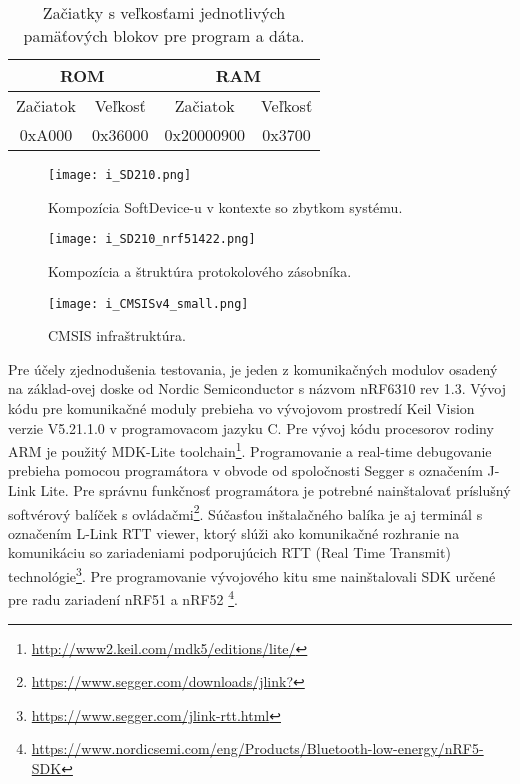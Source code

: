 \documentclass[12pt,a4paper,oneside,openright]{report}
\begin{document}
\begin{table}[h]
	\centering
	\caption{Začiatky s veľkosťami jednotlivých pamäťových blokov pre program a dáta.}
	\label{t:s210_memory}
	\begin{tabular}{|c|c|c|c|}
		\hline
		\multicolumn{2}{|c|}{ROM} & \multicolumn{2}{c|}{RAM} \\ \hline
		Začiatok     & Veľkosť    & Začiatok     & Veľkosť   \\ \hline
		0xA000       & 0x36000    & 0x20000900   & 0x3700    \\ \hline
	\end{tabular}
\end{table}

\begin{figure*}[h]
	\centering
	\texttt{[image: i\_SD210.png]}
	\caption{Kompozícia SoftDevice-u v kontexte so zbytkom systému\cite{SD210}.}
	\label{f:o_SD210}
\end{figure*}

\begin{figure*}[h]
	\centering
	\texttt{[image: i\_SD210\_nrf51422.png]}
	\caption{Kompozícia a štruktúra protokolového zásobníka\cite{SD210}.}
	\label{f:o_SD210_alone}
\end{figure*}

\begin{figure*}[h]
	\centering
	\texttt{[image: i\_CMSISv4\_small.png]}
	\caption{CMSIS infraštruktúra\cite{CMSIS}.}
	\label{f:o_CMSIS}
\end{figure*}

Pre účely zjednodušenia testovania, je jeden z komunikačných modulov osadený na základ-ovej doske od Nordic Semiconductor s názvom nRF6310 rev 1.3.
Vývoj kódu pre komunikačné moduly prebieha vo vývojovom prostredí Keil {\textmu}Vision verzie V5.21.1.0 v programovacom jazyku C. Pre vývoj kódu procesorov rodiny ARM je použitý MDK-Lite toolchain\footnote{\url{http://www2.keil.com/mdk5/editions/lite/}}. 
Programovanie a real-time debugovanie prebieha pomocou programátora v obvode od spoločnosti Segger s označením J-Link Lite. Pre správnu funkčnosť programátora je potrebné nainštalovať príslušný softvérový balíček s ovládačmi\footnote{\url{https://www.segger.com/downloads/jlink?}}. Súčasťou inštalačného balíka je aj terminál s označením L-Link RTT viewer, ktorý slúži ako komunikačné rozhranie na komunikáciu so zariadeniami podporujúcich RTT (Real Time Transmit) technológie\footnote{\url{https://www.segger.com/jlink-rtt.html}}.
Pre programovanie vývojového kitu sme nainštalovali SDK určené pre radu zariadení nRF51 a nRF52 \footnote{\url{https://www.nordicsemi.com/eng/Products/Bluetooth-low-energy/nRF5-SDK}}.
\end{document}
